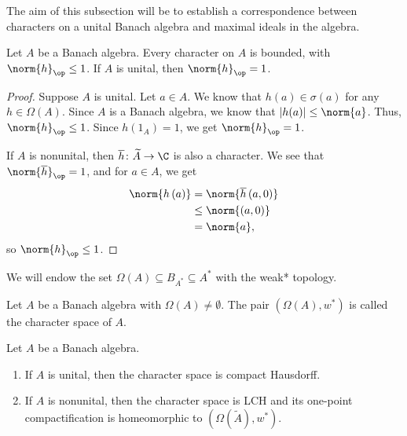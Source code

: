\documentclass[10pt]{mypackage}
\begin{document}
The aim of this subsection will be to establish a correspondence between characters on a unital Banach algebra and maximal ideals in the algebra.
\begin{proposition}
  Let $A$ be a Banach algebra. Every character on $A$ is bounded, with $\norm{h}_{\op} \leq 1$. If $A$ is unital, then $\norm{h}_{\op} = 1$.
\end{proposition}
\begin{proof}
  Suppose $A$ is unital. Let $a\in A$. We know that $h(a)\in \sigma\left(a\right)$ for any $h\in \Omega\left(A\right)$. Since $A$ is a Banach algebra, we know that $\left\vert h(a) \right\vert\leq \norm{a}$. Thus, $\norm{h}_{\op} \leq 1$. Since $h\left(1_A\right) = 1$, we get $\norm{h}_{\op} = 1$.\newline

  If $A$ is nonunital, then $\overline{h}\colon \widetilde{A}\rightarrow \C$ is also a character. We see that $\norm{\overline{h}}_{\op} = 1$, and for $a\in A$, we get
  \begin{align*}
    \norm{h\left(a\right)} &= \norm{\overline{h}\left(a,0\right)}\\
                           &\leq \norm{\left(a,0\right)}\\
                           &= \norm{a},
  \end{align*}
  so $\norm{h}_{\op}\leq 1$.
\end{proof}
We will endow the set $\Omega\left(A\right)\subseteq B_{A^{\ast}}\subseteq A^{\ast}$ with the weak* topology. 
\begin{definition}
  Let $A$ be a Banach algebra with $\Omega\left(A\right)\neq \emptyset$. The pair $\left(\Omega\left(A\right),w^{\ast}\right)$ is called the character space of $A$.
\end{definition}
\begin{proposition}
  Let $A$ be a Banach algebra.
  \begin{enumerate}[(1)]
    \item If $A$ is unital, then the character space is compact Hausdorff.
    \item If $A$ is nonunital, then the character space is LCH and its one-point compactification is homeomorphic to $\left(\Omega\left(\widetilde{A}\right),w^{\ast}\right)$.
  \end{enumerate}
\end{proposition}
\end{document}
